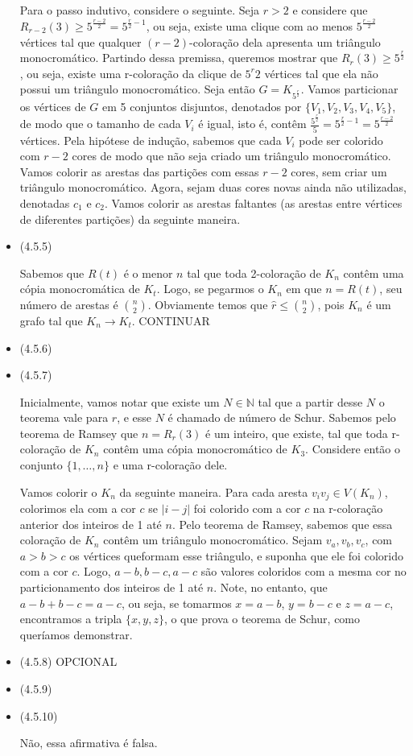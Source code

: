 \documentclass{article}
\begin{document}
\begin{itemize}
	      Para o passo indutivo, considere o seguinte. Seja \(r > 2\) e considere que \(R_{r-2}(3) \geq 5^{\frac{r-2}{2}} = 5^{\frac{r}{2}-1}\), ou seja, existe uma clique com ao menos \(5^{\frac{r-2}{2}}\) vértices tal que qualquer \((r - 2)\)-coloração dela apresenta
	      um triângulo monocromático. Partindo dessa premissa, queremos mostrar que \(R_r(3) \geq 5^{\frac{r}{2}}\), ou seja, existe uma r-coloração da clique de \(5^{r}{2}\) vértices tal que ela não possui um triângulo monocromático. Seja então \(G = K_{5^{\frac{r}{2}}}\).
	      Vamos particionar os vértices de \(G\) em 5 conjuntos disjuntos, denotados por \(\{V_1, V_2, V_3, V_4, V_5\}\), de modo que o tamanho de cada \(V_i\) é igual, isto é, contêm \(\frac{5^{\frac{r}{2}}}{5} = 5^{\frac{r}{2} - 1} = 5^{\frac{r - 2}{2}}\) vértices. Pela hipótese
	      de indução, sabemos que cada \(V_i\) pode ser colorido com \(r-2\) cores de modo que não seja criado um triângulo monocromático. Vamos colorir as arestas das partições com essas \(r-2\) cores, sem criar um triângulo monocromático. Agora, sejam duas cores novas ainda não utilizadas,
	      denotadas \(c_1\) e \(c_2\). Vamos colorir as arestas faltantes (as arestas entre vértices de diferentes partições) da seguinte maneira.

	\item (4.5.5)

	      Sabemos que \(R(t)\) é o menor \(n\) tal que toda 2-coloração de \(K_n\) contêm uma cópia monocromática de \(K_t\). Logo, se pegarmos o \(K_n\) em que \(n = R(t)\), seu número de arestas é \(\binom{n}{2}\). Obviamente temos que
	      \(\hat{r} \leq \binom{n}{2}\), pois \(K_n\) é um grafo tal que \(K_n \rightarrow K_t\). CONTINUAR

	\item (4.5.6)
	\item (4.5.7)

	      Inicialmente, vamos notar que existe um \(N \in \mathbb{N}\) tal que a partir desse \(N\) o teorema vale para \(r\), e esse \(N\) é chamado de número de
	      Schur. Sabemos pelo teorema de Ramsey que \(n = R_r(3)\) é um inteiro, que existe, tal que
	      toda r-coloração de \(K_n\) contêm uma cópia monocromático de \(K_3\).
	      Considere então o conjunto \(\{1, \dots, n\}\) e uma r-coloração dele.

	      Vamos colorir o \(K_n\) da seguinte maneira. Para cada aresta \(v_iv_j \in V(K_n)\), colorimos ela com a cor \(c\) se \(|i - j|\) foi colorido com a cor
	      \(c\) na r-coloração anterior dos inteiros de 1 até \(n\). Pelo teorema de Ramsey, sabemos que essa coloração de \(K_n\) contêm um triângulo monocromático.
	      Sejam \(v_a, v_b, v_c\), com \(a > b > c\) os vértices queformam esse triângulo, e suponha que ele foi colorido com a cor \(c\). Logo,
	      \(a - b, b - c, a - c\) são valores coloridos com a mesma cor no particionamento dos inteiros de 1 até \(n\). Note, no entanto, que
	      \(a - b + b - c = a - c\), ou seja, se tomarmos \(x = a - b\), \(y = b - c\) e \(z = a - c\), encontramos a tripla \(\{x,y,z\}\), o que prova o
	      teorema de Schur, como queríamos demonstrar.

	\item (4.5.8) OPCIONAL
	\item (4.5.9)
	\item (4.5.10)

	      Não, essa afirmativa é falsa.
\end{itemize}
\end{document}
